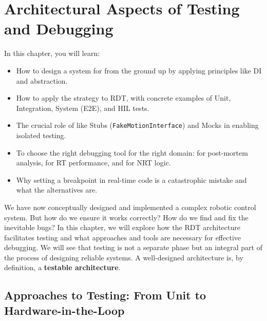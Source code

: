 
\chapter{Architectural Aspects of Testing and Debugging}
\label{chap:testing_debugging}

\begin{navigationbox}{In this chapter, you will learn:}
    \begin{itemize}
        \item How to design a system for  from the ground up by applying principles like DI and abstraction.
        \item How to apply the  strategy to RDT, with concrete examples of Unit, Integration, System (E2E), and HIL tests.
        \item The crucial role of  like Stubs (\texttt{FakeMotionInterface}) and Mocks in enabling isolated testing.
        \item To choose the right debugging tool for the right domain:  for post-mortem analysis,  for RT performance, and  for NRT logic.
        \item Why setting a breakpoint in real-time code is a catastrophic mistake and what the alternatives are.
    \end{itemize}
\end{navigationbox}

We have now conceptually designed and implemented a complex robotic control system. But how do we ensure it works correctly? How do we find and fix the inevitable bugs? In this chapter, we will explore how the RDT architecture facilitates testing and what approaches and tools are necessary for effective debugging. We will see that testing is not a separate phase but an integral part of the process of designing reliable systems. A well-designed architecture is, by definition, a \textbf{testable architecture}.

\section{Approaches to Testing: From Unit to Hardware-in-the-Loop}
\label{sec:testing_approaches}

